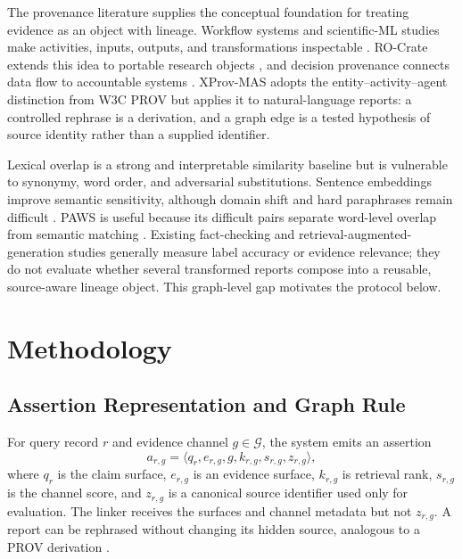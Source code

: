 \documentclass[graybox]{svmult}
\begin{document}
The provenance literature supplies the conceptual foundation for treating evidence as an object with lineage. Workflow systems and scientific-ML studies make activities, inputs, outputs, and transformations inspectable \cite{Anontticsbth361,Anong2010118r86,Anonw002cpe6544}. RO-Crate extends this idea to portable research objects \cite{Anonrone0309210}, and decision provenance connects data flow to accountable systems \cite{Anond0182887201}. XProv-MAS adopts the entity--activity--agent distinction from W3C PROV but applies it to natural-language reports: a controlled rephrase is a derivation, and a graph edge is a tested hypothesis of source identity rather than a supplied identifier.

Lexical overlap is a strong and interpretable similarity baseline but is vulnerable to synonymy, word order, and adversarial substitutions. Sentence embeddings improve semantic sensitivity, although domain shift and hard paraphrases remain difficult \cite{Anona13jair2985,Anonscolia00237,Anonr7901593192,Anonm0219619735,Anona1453593042}. PAWS is useful because its difficult pairs separate word-level overlap from semantic matching \cite{zhang2019paws}. Existing fact-checking and retrieval-augmented-generation studies generally measure label accuracy or evidence relevance; they do not evaluate whether several transformed reports compose into a reusable, source-aware lineage object. This graph-level gap motivates the protocol below.

\section{Methodology}

\subsection{Assertion Representation and Graph Rule}

For query record $r$ and evidence channel $g\in\mathcal{G}$, the system emits an assertion
\begin{equation}
 a_{r,g}=\langle q_r,e_{r,g},g,k_{r,g},s_{r,g},z_{r,g}\rangle,
 \label{eq:assertion}
\end{equation}
where $q_r$ is the claim surface, $e_{r,g}$ is an evidence surface, $k_{r,g}$ is retrieval rank, $s_{r,g}$ is the channel score, and $z_{r,g}$ is a canonical source identifier used only for evaluation. The linker receives the surfaces and channel metadata but not $z_{r,g}$. A report can be rephrased without changing its hidden source, analogous to a PROV derivation \cite{w3c2013prov}.
\end{document}
